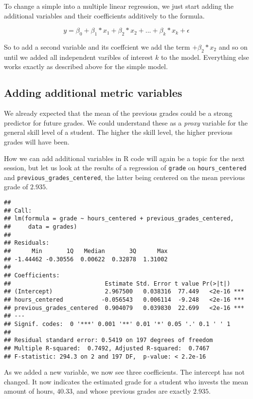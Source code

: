 \documentclass[
]{book}
\begin{document}
To change a simple into a multiple linear regression, we just start adding the
additional variables and their coefficients additively to the formula.

\[y = \beta_0 + \beta_1*x_1 + \beta_2*x_2 + ... + \beta_k*x_k + \epsilon\]

So to add a second variable and its coeffcient we add the term \(+ \beta_2*x_2\)
and so on until we added all independent varibles of interest \(k\) to the model.
Everything else works exactly as described above for the simple model.

\hypertarget{adding-additional-metric-variables}{%
\subsection{Adding additional metric variables}\label{adding-additional-metric-variables}}

We already expected that the mean of the previous grades could be a strong
predictor for future grades. We could understand these as a \emph{proxy} variable for
the general skill level of a student. The higher the skill level, the higher
previous grades will have been.

How we can add additional variables in R code will again be a topic for the next
session, but let us look at the results of a regression of \texttt{grade} on
\texttt{hours\_centered} and \texttt{previous\_grades\_centered}, the latter being centered on the
mean previous grade of \(2.935\).

\begin{verbatim}
## 
## Call:
## lm(formula = grade ~ hours_centered + previous_grades_centered, 
##     data = grades)
## 
## Residuals:
##      Min       1Q   Median       3Q      Max 
## -1.44462 -0.30556  0.00622  0.32878  1.31002 
## 
## Coefficients:
##                           Estimate Std. Error t value Pr(>|t|)    
## (Intercept)               2.967500   0.038316  77.449   <2e-16 ***
## hours_centered           -0.056543   0.006114  -9.248   <2e-16 ***
## previous_grades_centered  0.904079   0.039830  22.699   <2e-16 ***
## ---
## Signif. codes:  0 '***' 0.001 '**' 0.01 '*' 0.05 '.' 0.1 ' ' 1
## 
## Residual standard error: 0.5419 on 197 degrees of freedom
## Multiple R-squared:  0.7492, Adjusted R-squared:  0.7467 
## F-statistic: 294.3 on 2 and 197 DF,  p-value: < 2.2e-16
\end{verbatim}

As we added a new variable, we now see three coefficients.
The intercept has not changed. It now indicates the estimated grade for a
student who invests the mean amount of hours, \(40.33\), and whose previous grades
are exactly \(2.935\).
\end{document}
